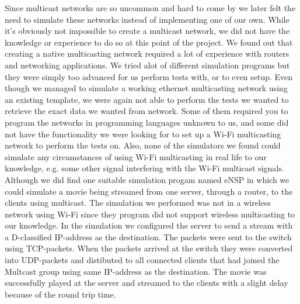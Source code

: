 \documentclass[9pt,a4paper]{acmproc}
\begin{document}
Since multicast networks are so uncommon and hard to come by we later felt the need to simulate these networks instead of implementing one of our own. While it’s obviously not impossible to create a multicast network, we did not have the knowledge or experience to do so at this point of the project. We found out that creating a native multicasting network required a lot of experience with routers and networking applications. We tried alot of different simulation programs but they were simply too advanced for us perform tests with, or to even setup. Even though we managed to simulate a working ethernet multicasting network using an existing template, we were again not able to perform the tests we wanted to retrieve the exact data we wanted from network. Some of them required you to program the networks in programming languages unknown to us, and some did not have the functionality we were looking for to set up a Wi-Fi multicasting network to perform the tests on. Also, none of the simulators we found could simulate any circumstances of using Wi-Fi multicasting in real life to our knowledge, e.g. some other signal interfering with the Wi-Fi multicast signals.
Although we did find one suitable simulation progam named eNSP in which we could simulate a movie being streamed from one server, through a router, to the clients using multicast. The simulation we performed was not in a wireless network using Wi-Fi since they program did not support wireless multicasting to our knowledge. In the simulation we configured the server to send a stream with a D-classified IP-address as the destination. The packets were sent to the switch using TCP-packets. When the packets arrived at the switch they were converted into UDP-packets and distibuted to all connected clients that had joined the Multcast group using same IP-address as the destination. The movie was successfully played at the server and streamed to the clients with a slight delay because of the round trip time.
\end{document}
